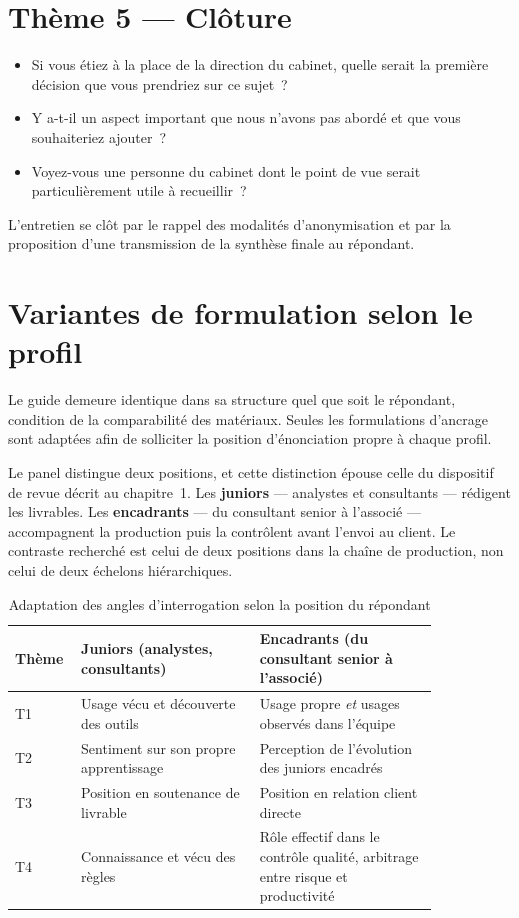 \section{Thème 5 --- Clôture}

\begin{itemize}
    \item Si vous étiez à la place de la direction du cabinet, quelle serait la
    première décision que vous prendriez sur ce sujet~?
    \item Y a-t-il un aspect important que nous n'avons pas abordé et que vous
    souhaiteriez ajouter~?
    \item Voyez-vous une personne du cabinet dont le point de vue serait
    particulièrement utile à recueillir~?
\end{itemize}

L'entretien se clôt par le rappel des modalités d'anonymisation et par la proposition
d'une transmission de la synthèse finale au répondant.

\section{Variantes de formulation selon le profil}

Le guide demeure identique dans sa structure quel que soit le répondant, condition de
la comparabilité des matériaux. Seules les formulations d'ancrage sont adaptées afin
de solliciter la position d'énonciation propre à chaque profil.

Le panel distingue deux positions, et cette distinction épouse celle du dispositif de
revue décrit au chapitre~1. Les \textbf{juniors} — analystes et consultants — rédigent les
livrables. Les \textbf{encadrants} — du consultant senior à l'associé —
accompagnent la production puis la contrôlent avant l'envoi au client. Le contraste
recherché est celui de deux positions dans la chaîne de production, non celui de deux
échelons hiérarchiques.

\begin{table}[h]
\centering
\small
\begin{tabular}{|p{0.08\linewidth}|p{0.38\linewidth}|p{0.38\linewidth}|}
\hline
\textbf{Thème} & \textbf{Juniors (analystes, consultants)} & \textbf{Encadrants (du consultant senior à l'associé)} \\
\hline
T1 & Usage vécu et découverte des outils & Usage propre \emph{et} usages observés dans l'équipe \\
\hline
T2 & Sentiment sur son propre apprentissage & Perception de l'évolution des juniors encadrés \\
\hline
T3 & Position en soutenance de livrable & Position en relation client directe \\
\hline
T4 & Connaissance et vécu des règles & Rôle effectif dans le contrôle qualité, arbitrage entre risque et productivité \\
\hline
\end{tabular}
\caption{Adaptation des angles d'interrogation selon la position du répondant}
\label{tab:variantes-profils}
\end{table}

